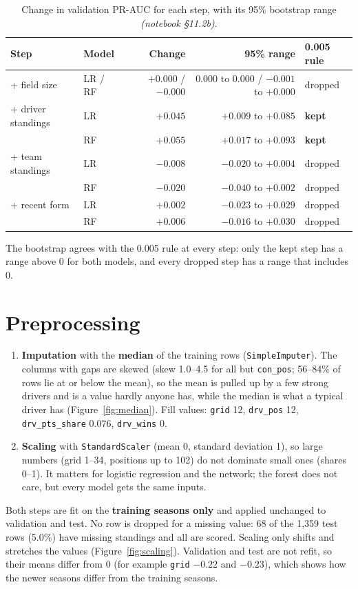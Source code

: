\documentclass[11pt,a4paper]{article}
\newcommand{\code}[1]{\texttt{#1}}
\newcommand{\fig}[1]{Figure~\ref{#1}}
\newcommand{\nb}[1]{\textit{(notebook \S#1)}}
\begin{document}
\begin{table}[H]
\centering\small
\caption{Change in validation PR-AUC for each step, with its 95\% bootstrap range \nb{11.2b}.}
\label{tab:selboot}
\begin{tabular}{llrrl}
\toprule
Step & Model & Change & 95\% range & 0.005 rule \\
\midrule
+ field size & LR / RF & $+0.000$ / $-0.000$ & $0.000$ to $0.000$ / $-0.001$ to $+0.000$ & dropped \\
+ driver standings & LR & $+0.045$ & $+0.009$ to $+0.085$ & \textbf{kept} \\
 & RF & $+0.055$ & $+0.017$ to $+0.093$ & \textbf{kept} \\
+ team standings & LR & $-0.008$ & $-0.020$ to $+0.004$ & dropped \\
 & RF & $-0.020$ & $-0.040$ to $+0.002$ & dropped \\
+ recent form & LR & $+0.002$ & $-0.023$ to $+0.029$ & dropped \\
 & RF & $+0.006$ & $-0.016$ to $+0.030$ & dropped \\
\bottomrule
\end{tabular}
\end{table}

The bootstrap agrees with the 0.005 rule at every step: only the kept step has a range above 0 for both models, and every dropped step has a range that includes 0.

\section{Preprocessing}\label{sec:prep}

\begin{enumerate}
\item \textbf{Imputation} with the \textbf{median} of the training rows (\code{SimpleImputer}). The columns with gaps are skewed (skew 1.0--4.5 for all but \code{con\_pos}; 56--84\% of rows lie at or below the mean), so the mean is pulled up by a few strong drivers and is a value hardly anyone has, while the median is what a typical driver has (\fig{fig:median}). Fill values: \code{grid} 12, \code{drv\_pos} 12, \code{drv\_pts\_share} 0.076, \code{drv\_wins} 0.
\item \textbf{Scaling} with \code{StandardScaler} (mean 0, standard deviation 1), so large numbers (grid 1--34, positions up to 102) do not dominate small ones (shares 0--1). It matters for logistic regression and the network; the forest does not care, but every model gets the same inputs.
\end{enumerate}
Both steps are fit on the \textbf{training seasons only} and applied unchanged to validation and test. No row is dropped for a missing value: 68 of the 1{,}359 test rows (5.0\%) have missing standings and all are scored. Scaling only shifts and stretches the values (\fig{fig:scaling}). Validation and test are not refit, so their means differ from 0 (for example \code{grid} $-0.22$ and $-0.23$), which shows how the newer seasons differ from the training seasons.
\end{document}
